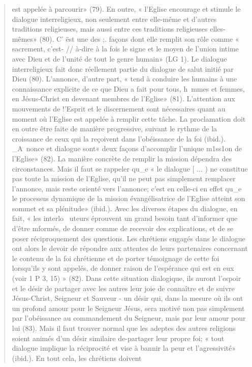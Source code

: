 \begin{quote}
est appelée à parcourir» (79). En outre, « l'Eglise encourage
et stimule le dialogue interreligieux, non seulement entre
elle-même et d'autres traditions religieuses, mais aussi entre
ces traditions religieuses elles-mêmes» (80). C' ëst une des ;.
façons dont elle remplit son rôle comme « sacrement, c'est- //
à-dire à la fois le signe et le moyen de l'union intime avec
Dieu et de l'unité de tout le genre humain» (LG 1). Le dialogue
interreligieux fait donc réellement partie du dialogue de
salut initié par Dieu (80).
L'annonce, d'autre part, « tend à conduire les humains à une
connaissance explicite de ce que Dieu a fait pour tous,
h~mmes et femmes, en Jésus-Christ en devenant membres de
l'Eglise» (81). L'attention aux mouvements de !'Esprit et le
discernement sont nécessaires quant au moment où l'Eglise est
appelée à remplir cette tâche. La proclamation doit en outre
être faite de manière progressive, suivant le rythme de la croissance
de ceux qui la reçoivent dans l'obéissance de la foi
(ibid.).
_A~nonce et dialogue sont« deux façons d'accomplir l'unique
m1ss1on de l'Eglise» (82). La manière concrète de remplir la
mission dépendra des circonstances. Mais il faut se rappeler
qu_e « le dialogue [ ... ) ne constitue pas toute la mission de
l'Eglise, qu'il ne peut pas simplement remplacer l'annonce,
mais reste orienté vers l'annonce; c'est en celle-ci en effet
qu_e le processus dynamique de la mission évangélisatrice de
l'Eglise atteint son sommet et sa plénitude» (ibid.).
Avec les diverses étapes du dialogue, en fait, « les interlo~
uteurs éprouvent un grand besoin tant d'informer que d'être
mformés, de donner comme de recevoir des explications, et de
se poser réciproquement des questions. Les chrétiens engagés
dans le dialogue ont alors le devoir de répondre aux attentes
de leurs partenaires concernant le contenu de la foi chrétienne
et de porter témoignage de cette foi lorsqu'ils y sont appelés,
de donner raison de l'espérance qui est en eux (voir 1 P 3,
15) » (82). Dans cette situation dialogique, ils auront l'espoir et
le désir de partager avec les autres leur joie de connaître et de
suivre Jésus-Christ, Seigneur et Sauveur - un désir qui, dans
la mesure où ils ont un profond amour pour le Seigneur Jésus,
sera motivé non pas simplement par l'obéissance au commandement
du Seigneur, mais par leur amour pour lui (83). Mais
il faut trouver normal que les adeptes des autres religions
soient animés d'un désir similaire de-partager leur propre foi;
« tout dialogue implique la réciprocité et vise à bannir la peur
et l'agressivité» (ibid.). En tout cela, les chrétiens doivent

\end{quote}
